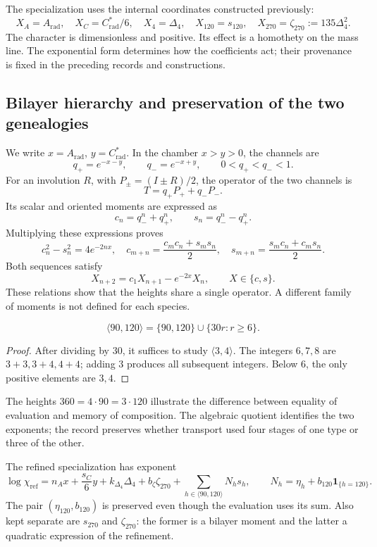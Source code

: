 The specialization uses the internal coordinates constructed previously:
\[
 X_A=A_{\mathrm{rad}},\quad X_C=C^*_{\mathrm{rad}}/6,
 \quad X_4=\Delta_4,\quad X_{120}=s_{120},\quad
 X_{270}=\zeta_{270}:=135\Delta_4^2.
\]
The character is dimensionless and positive. Its effect is a homothety on
the mass line. The exponential form determines how the
coefficients act; their provenance is fixed in the preceding records and
constructions.

\subsection{Bilayer hierarchy and preservation of the two genealogies}

We write \(x=A_{\mathrm{rad}}\), \(y=C^*_{\mathrm{rad}}\). In the
chamber \(x>y>0\), the channels are
\[
 q_+=e^{-x-y},\qquad q_-=e^{-x+y},\qquad0<q_+<q_-<1.
\]
For an involution \(R\), with \(P_\pm=(I\pm R)/2\), the operator
of the two channels is
\[
 T=q_+P_++q_-P_-.
\]
Its scalar and oriented moments are expressed as
\[
 c_n=q_-^n+q_+^n,\qquad s_n=q_-^n-q_+^n.
\]
Multiplying these expressions proves
\[
 c_n^2-s_n^2=4e^{-2nx},\quad
 c_{m+n}=\frac{c_mc_n+s_ms_n}{2},\quad
 s_{m+n}=\frac{s_mc_n+c_ms_n}{2}.
\]
Both sequences satisfy
\[
 X_{n+2}=c_1X_{n+1}-e^{-2x}X_n,\qquad X\in\{c,s\}.
\]
These relations show that the heights share a single operator.
A different family of moments is not defined for each species.

\begin{proposition}
\[
 \langle90,120\rangle=\{90,120\}\cup\{30r:r\ge6\}.
\]
\end{proposition}
\begin{proof}
After dividing by \(30\), it suffices to study \(\langle3,4\rangle\).
The integers \(6,7,8\) are \(3+3,3+4,4+4\); adding \(3\) produces
all subsequent integers. Below \(6\), the only
positive elements are \(3,4\).
\end{proof}

The heights \(360=4\cdot90=3\cdot120\) illustrate the difference between
equality of evaluation and memory of composition. The algebraic quotient
identifies the two exponents; the record preserves whether transport
used four stages of one type or three of the other.

The refined specialization has exponent
\[
 \log\chi_{\mathrm{ref}}=n_Ax+\frac{s_C}{6}y+k_{\Delta_4}\Delta_4
 +b_{\zeta}\zeta_{270}+\sum_{h\in\langle90,120\rangle}N_hs_h,
 \qquad N_h=\eta_h+b_{120}\mathbf1_{\{h=120\}}.
\]
The pair \((\eta_{120},b_{120})\) is preserved even though the evaluation uses
its sum. Also kept separate are \(s_{270}\) and
\(\zeta_{270}\): the former is a bilayer moment and the latter a
quadratic expression of the refinement.


